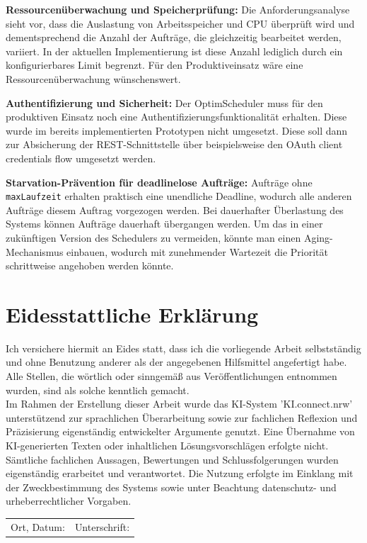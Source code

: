 \documentclass[
    12pt,               
    a4paper,            
    ngerman,            
    parskip=half,       
    headings=normal,   
    numbers=enddot,     
    toc=chapterentrywithdots 
]{scrreprt}\usepackage[utf8]{inputenc}
\begin{document}
\textbf{Ressourcenüberwachung und Speicherprüfung:} Die Anforderungsanalyse sieht vor, dass die Auslastung von Arbeitsspeicher und CPU überprüft wird und dementsprechend die Anzahl der Aufträge, die gleichzeitig bearbeitet werden, variiert. In der aktuellen Implementierung ist diese Anzahl lediglich durch ein konfigurierbares Limit begrenzt. Für den Produktiveinsatz wäre eine Ressourcenüberwachung wünschenswert.

\textbf{Authentifizierung und Sicherheit:} Der OptimScheduler muss für den produktiven Einsatz noch eine Authentifizierungsfunktionalität erhalten. Diese wurde im bereits implementierten Prototypen nicht umgesetzt. Diese soll dann zur Absicherung der REST-Schnittstelle über beispielsweise den OAuth client credentials flow umgesetzt werden.

\textbf{Starvation-Prävention für deadlinelose Aufträge:} Aufträge ohne \texttt{maxLaufzeit} erhalten praktisch eine unendliche Deadline, wodurch alle anderen Aufträge diesem Auftrag vorgezogen werden. Bei dauerhafter Überlastung des Systems können Aufträge dauerhaft übergangen werden. Um das in einer zukünftigen Version des Schedulers zu vermeiden, könnte man einen Aging-Mechanismus einbauen, wodurch mit zunehmender Wartezeit die Priorität schrittweise angehoben werden könnte.

\newpage



\newpage
\section*{Eidesstattliche Erklärung}
Ich versichere hiermit an Eides statt, dass ich die vorliegende Arbeit selbstständig und ohne Benutzung anderer als der angegebenen Hilfsmittel angefertigt habe. Alle Stellen, die wörtlich oder sinngemäß aus Veröffentlichungen entnommen wurden, sind als solche kenntlich gemacht.\\ Im Rahmen der Erstellung dieser Arbeit wurde das KI-System 'KI.connect.nrw' unterstützend zur sprachlichen Überarbeitung sowie zur fachlichen Reflexion und Präzisierung eigenständig entwickelter Argumente genutzt. Eine Übernahme von KI-generierten Texten oder inhaltlichen Lösungsvorschlägen erfolgte nicht. Sämtliche fachlichen Aussagen, Bewertungen und Schlussfolgerungen wurden eigenständig erarbeitet und verantwortet. Die Nutzung erfolgte im Einklang mit der Zweckbestimmung des Systems sowie unter Beachtung datenschutz- und urheberrechtlicher Vorgaben.
\vfill
\noindent
\begin{tabular}{p{} p{}}
Ort, Datum: \hrulefill & Unterschrift: \hrulefill \\
\end{tabular}

\clearpage
\end{document}
